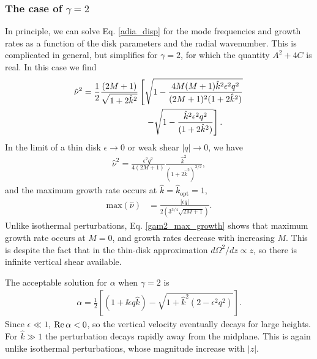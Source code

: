 \subsubsection{The case of $\gamma=2$}
In principle, we can solve Eq. \ref{adia_disp} for the mode
frequencies and growth rates as a function of the disk parameters and
the radial wavenumber. This is complicated in 
general, but simplifies for $\gamma=2$, for which the quantity
$A^2+4C$ is real. In this case we find
\begin{align}
  \hat{\nu}^2 =
  \frac{1}{2}\frac{(2M+1)}{\sqrt{1+2\hat{k}^2}}&\left[
    \sqrt{1-\frac{4M(M+1)\hat{k}^2\epsilon^2q^2}{(2M+1)^2(1+2\hat{k}^2)}}\right.\notag\\
  &\phantom{=}
  \left.- \sqrt{1 - \frac{\hat{k}^2\epsilon^2q^2}{(1+2\hat{k}^2)}}\right].
\end{align}
In the limit of a thin disk $\epsilon\to0$ or weak shear $|q|\to0$, we
have 
\begin{align}
  \hat{\nu}^2 = \frac{\epsilon^2
    q^2}{4(2M+1)}\frac{\hat{k}^2}{(1+2\hat{k}^2)^{3/2}},\label{gam2_growth}
\end{align}
and the maximum growth rate occurs at $\hat{k}=\hat{k}_\mathrm{opt}=1$,  
\begin{align}
  \mathrm{max}(\hat{\nu}) &= \frac{|\epsilon
    q|}{2(3^{3/4}\sqrt{2M+1})}\label{gam2_max_growth}.
\end{align}
Unlike isothermal perturbations, Eq. \ref{gam2_max_growth} shows that
maximum growth rate occurs at $M=0$, and growth rates decrease with increasing $M$. This
is despite the fact that in the thin-disk approximation 
$d\Omega^2/dz\propto z$, so there is infinite vertical shear
available.     

The acceptable solution for $\alpha$ when $\gamma=2$ is
\begin{align}
  \alpha = \frac{1}{2}\left[\left(1+\ii\epsilon q \hat{k}\right) -
    \sqrt{1 + \hat{k}^2\left(2-\epsilon^2 q^2\right)}\right].\label{gam2_alpha}
\end{align}
Since $\epsilon\ll 1$, $\operatorname{Re}\alpha<0$, so the vertical velocity
eventually decays for large heights. For $\hat{k}\gg 1$ the
perturbation decays rapidly away from the midplane. This is again
unlike isothermal perturbations, whose magnitude increase with $|z|$.  


